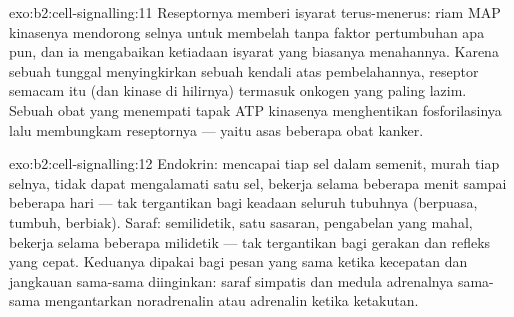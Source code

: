 \begin{solution}{exo:b2:cell-signalling:11}
Reseptornya memberi isyarat terus-menerus: riam MAP kinasenya
mendorong selnya untuk membelah tanpa faktor pertumbuhan apa pun, dan
ia mengabaikan ketiadaan isyarat yang biasanya menahannya. Karena
sebuah  tunggal menyingkirkan sebuah kendali atas pembelahannya,
reseptor semacam itu (dan kinase di hilirnya) termasuk onkogen yang
paling lazim. Sebuah obat yang menempati tapak ATP kinasenya
menghentikan fosforilasinya lalu membungkam reseptornya --- yaitu asas
beberapa obat kanker.
\end{solution}

\begin{solution}{exo:b2:cell-signalling:12}
Endokrin: mencapai tiap sel dalam semenit, murah tiap selnya, tidak
dapat mengalamati satu sel, bekerja selama beberapa menit sampai
beberapa hari --- tak tergantikan bagi keadaan seluruh tubuhnya
(berpuasa, tumbuh, berbiak). Saraf: semilidetik, satu sasaran,
pengabelan yang mahal, bekerja selama beberapa milidetik --- tak
tergantikan bagi gerakan dan refleks yang cepat. Keduanya dipakai bagi
pesan yang sama ketika kecepatan dan jangkauan sama-sama diinginkan:
saraf simpatis dan medula adrenalnya sama-sama mengantarkan
noradrenalin atau adrenalin ketika ketakutan.
\end{solution}

